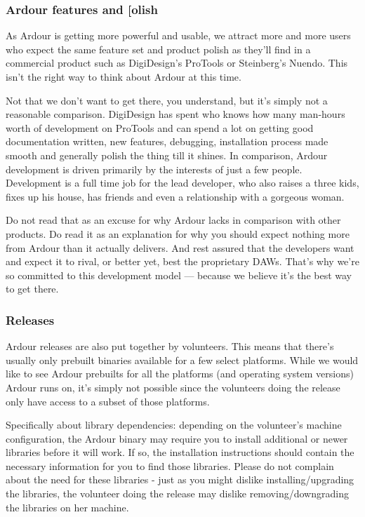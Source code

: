 \documentclass[10pt,a4paper]{book}
\begin{document}
\subsubsection{Ardour features and [olish}

As Ardour is getting more powerful and usable, we attract more and
more users who expect the same feature set and product polish as
they'll find in a commercial product such as DigiDesign's ProTools or
Steinberg's Nuendo. This isn't the right way to think about Ardour at
this time.

Not that we don't want to get there, you understand, but it's simply
not a reasonable comparison. DigiDesign has spent who knows how many
man-hours worth of development on ProTools and can spend a lot on
getting good documentation written, new features, debugging,
installation process made smooth and generally polish the thing till
it shines. In comparison, Ardour development is driven primarily by
the interests of just a few people. Development is a full time job for
the lead developer, who also raises a three kids, fixes up his house,
has friends and even a relationship with a gorgeous woman.

Do not read that as an excuse for why Ardour lacks in comparison with
other products. Do read it as an explanation for why you should expect
nothing more from Ardour than it actually delivers. And rest assured
that the developers want and expect it to rival, or better yet, best
the proprietary DAWs. That's why we're so committed to this
development model --- because we believe it's the best way to get there.

\subsubsection{Releases}

Ardour releases are also put together by volunteers. This means that
there's usually only prebuilt binaries available for a few select
platforms. While we would like to see Ardour prebuilts for all the
platforms (and operating system versions) Ardour runs on, it's simply
not possible since the volunteers doing the release only have access
to a subset of those platforms.

Specifically about library dependencies: depending on the volunteer's
machine configuration, the Ardour binary may require you to install
additional or newer libraries before it will work. If so, the
installation instructions should contain the necessary information for
you to find those libraries. Please do not complain about the need for
these libraries - just as you might dislike installing/upgrading the
libraries, the volunteer doing the release may dislike
removing/downgrading the libraries on her machine.
\end{document}
